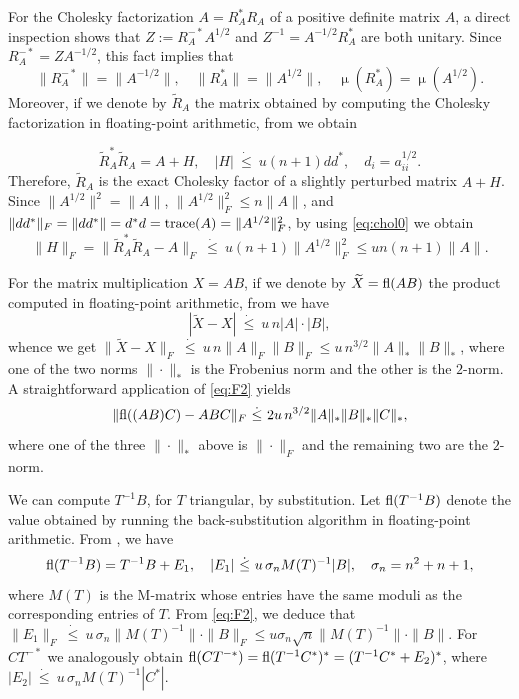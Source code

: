 \documentclass[DIV=14]{scrartcl}
\newcommand\ledot{~\dot{\le}~}
\theoremstyle{thmstyletwo}
\theoremstyle{definition}
\numberwithin{equation}{section}
\newcommand{\wt}{\widetilde}
\newcommand{\deq}{\ensuremath{:=}}
\DeclareMathOperator{\cond}{\mu}
\begin{document}
For the Cholesky factorization $A=R_A^*R_A$ of a positive definite matrix $A$, a direct inspection shows that $Z\deq{}R_A^{-*}A^{1/2}$ and
$Z^{-1}=A^{-1/2}R_A^*$ are both unitary. Since $R_A^{-*}=ZA^{-1/2}$, this fact implies that
 \begin{equation}\label{eq:nrm}
 \|R_A^{-*}\|=\|A^{-1/2}\|,\quad
\|R_A^*\|=\|A^{1/2}\|, \quad
\cond(R_A^*)=\cond(A^{1/2}).
\end{equation}
Moreover, if we denote by $\wt R_A$
the matrix obtained by computing the Cholesky factorization in floating-point arithmetic, from \cite[Thm.~10.5]{higham:book02} we obtain

\begin{equation}\label{eq:chol0}
  \wt R_A^*\wt R_A= A+H,\quad |H|\ledot u(n+1)dd^*,\quad d_i=a_{ii}^{1/2}.
\end{equation}
Therefore, $\wt R_A$ is the exact Cholesky factor of a slightly perturbed matrix $A+H$.
Since \mbox{$\|A^{1/2}\|^2=\|A\|$}, $\|A^{1/2}\|_F^2\le n\|A\|$, and $\|dd^*\|_F=\|dd^*\|=d^*d=\hbox{trace}(A)=\|A^{1/2}\|_F^2$, by using \eqref{eq:chol0} we obtain
\begin{equation}\label{eq:cholD}
\|H\|_F=\|\wt R_A^*\wt R_A-A\|_F\ledot u(n+1)\|A^{1/2}\|_F^2\le u n (n+1)\|A\|.
\end{equation}

For the matrix multiplication $X=AB$, if we denote by $\wt X=\hbox{fl}(AB)$ the product computed in floating-point arithmetic, from \cite[eq.~(3.13)]{higham:book02} we have
\begin{equation}\label{eq:mm2}
|\wt X-X|\ledot u\,n |A|\cdot |B|,
\end{equation}
whence we get
$
\|\wt X-X\|_F\ledot u\,n\|A\|_F\|B\|_F\le u\,n^{3/2}\|A\|_*\|B\|_*$, where one of the two norms $\|\cdot\|_*$ is the Frobenius norm and the other is the $2$-norm.
A straightforward application of \eqref{eq:F2} yields
\begin{equation}\label{eq:mmE}
\|\hbox{fl}((AB)C)-ABC\|_F\ledot 2u\, n^{3/2}\|A\|_*\|B\|_*\|C\|_*,
\end{equation}
where one of the three $\|\cdot\|_*$ above is $\|\cdot\|_F$ and the remaining two are the $2$-norm.

We can compute $T^{-1}B$, for $T$ triangular, by substitution. Let $\hbox{fl}(T^{-1}B)$ denote the value obtained by running the back-substitution algorithm in floating-point arithmetic. From \cite[Thm.~8.10]{higham:book02}, we have
\begin{equation}\label{eq:tinv}
\hbox{fl}(T^{-1}B)=T^{-1}B+E_1,\quad |E_1|\ledot u\,\sigma_n M(T)^{-1}|B|,\quad \sigma_n=n^2+n+1,
\end{equation}
where $M(T)$ is the M-matrix whose entries have the same moduli as the corresponding entries of $T$.
From \eqref{eq:F2}, we deduce that
$\|E_1\|_F\ledot u\,\sigma_n\|M(T)^{-1}\|\cdot \|B\|_F\le u\sigma_n\sqrt n\|M(T)^{-1}\| \cdot\|B\|$.
For $CT^{-*}$ we analogously obtain $\hbox{fl}(CT^{-*})=\hbox{fl}(T^{-1}C^*)^*=(T^{-1}C^*+E_2)^*$, where
$|E_2|\ledot u\,\sigma_nM(T)^{-1}|C^*|$.
\end{document}
